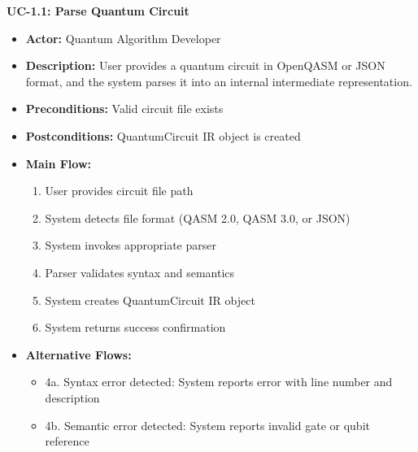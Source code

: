 \textbf{UC-1.1: Parse Quantum Circuit}
\begin{itemize}
\item \textbf{Actor:} Quantum Algorithm Developer
\item \textbf{Description:} User provides a quantum circuit in OpenQASM or JSON format, and the system parses it into an internal intermediate representation.
\item \textbf{Preconditions:} Valid circuit file exists
\item \textbf{Postconditions:} QuantumCircuit IR object is created
\item \textbf{Main Flow:}
\begin{enumerate}
\item User provides circuit file path
\item System detects file format (QASM 2.0, QASM 3.0, or JSON)
\item System invokes appropriate parser
\item Parser validates syntax and semantics
\item System creates QuantumCircuit IR object
\item System returns success confirmation
\end{enumerate}
\item \textbf{Alternative Flows:}
\begin{itemize}
\item 4a. Syntax error detected: System reports error with line number and description
\item 4b. Semantic error detected: System reports invalid gate or qubit reference
\end{itemize}
\end{itemize}

